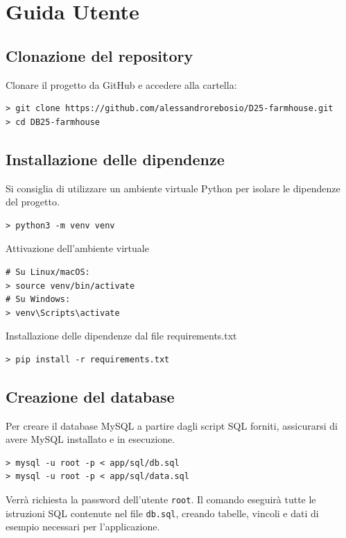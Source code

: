 \documentclass[a4paper,12pt]{report}
\begin{document}
\appendix
\chapter{Guida Utente}

\section{Clonazione del repository}
Clonare il progetto da GitHub e accedere alla cartella:

\begin{verbatim}
> git clone https://github.com/alessandrorebosio/D25-farmhouse.git
> cd DB25-farmhouse
\end{verbatim}

\section{Installazione delle dipendenze}

Si consiglia di utilizzare un ambiente virtuale Python per isolare le dipendenze del progetto.

\begin{verbatim}
> python3 -m venv venv
\end{verbatim}

\noindent Attivazione dell'ambiente virtuale
\begin{verbatim}
# Su Linux/macOS:
> source venv/bin/activate
# Su Windows:
> venv\Scripts\activate
\end{verbatim}

\noindent Installazione delle dipendenze dal file requirements.txt
\begin{verbatim}
> pip install -r requirements.txt
\end{verbatim}

\section{Creazione del database}

Per creare il database MySQL a partire dagli script SQL forniti, assicurarsi di avere MySQL
installato e in esecuzione.

\begin{verbatim}
> mysql -u root -p < app/sql/db.sql
> mysql -u root -p < app/sql/data.sql
\end{verbatim}

Verrà richiesta la password dell'utente \texttt{root}. Il comando eseguirà tutte le
istruzioni SQL contenute nel file \texttt{db.sql}, creando tabelle, vincoli e dati di
esempio necessari per l'applicazione.
\end{document}
